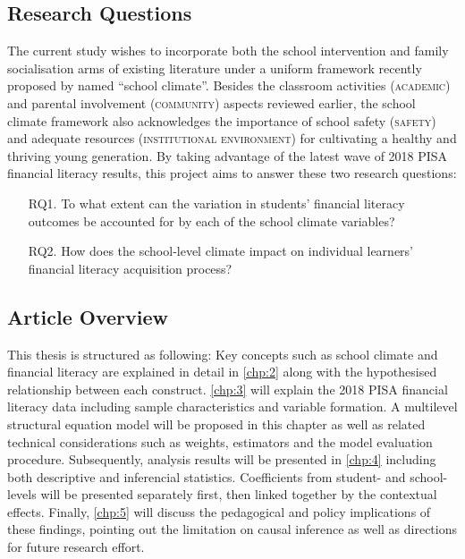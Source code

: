 \documentclass[review]{elsarticle}
\begin{document}
\subsection{Research Questions}\label{sec:rq}

The current study wishes to incorporate both the school intervention and family socialisation arms of existing literature under a uniform framework recently proposed by \citet{wang:2016} named ``school climate''. Besides the classroom activities (\textsc{academic}) and parental involvement (\textsc{community}) aspects reviewed earlier, the school climate framework also acknowledges the importance of school safety (\textsc{safety}) and adequate resources (\textsc{institutional environment}) for cultivating a healthy and thriving young generation. By taking advantage of the latest wave of 2018 PISA financial literacy results, this project aims to answer these two research questions:
\begin{enumerate}
    \item[RQ1.] To what extent can the variation in students' financial literacy outcomes be accounted for by each of the school climate variables?
    \item[RQ2.] How does the school-level climate impact on individual learners' financial literacy acquisition process?
\end{enumerate}

\subsection{Article Overview}

This thesis is structured as following: Key concepts such as school climate and financial literacy are explained in detail in \cref{chp:2} along with the hypothesised relationship between each construct. \cref{chp:3} will explain the 2018 PISA financial literacy data including sample characteristics and variable formation. A multilevel structural equation model will be proposed in this chapter as well as related technical considerations such as weights, estimators and the model evaluation procedure. Subsequently, analysis results will be presented in \cref{chp:4} including both descriptive and inferencial statistics. Coefficients from student- and school-levels will be presented separately first, then linked together by the contextual effects. Finally, \cref{chp:5} will discuss the pedagogical and policy implications of these findings, pointing out the limitation on causal inference as well as directions for future research effort.
\end{document}
